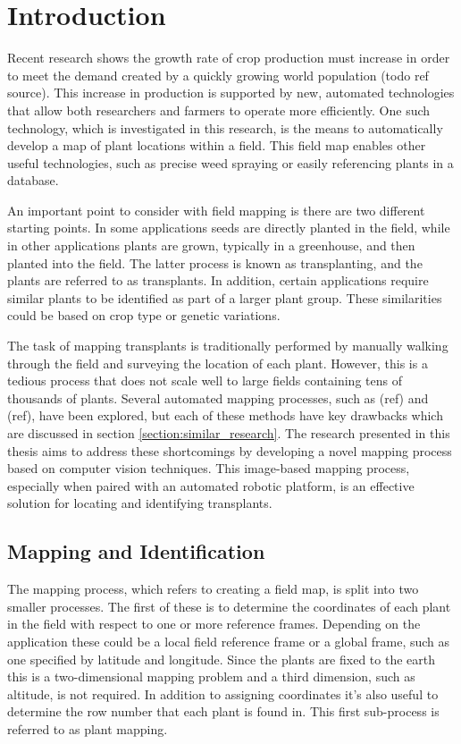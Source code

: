 
\cleardoublepage

\chapter{Introduction}
\label{introduction}

Recent research shows the growth rate of crop production must increase in order to meet the demand created by a quickly growing world population (todo ref source).  This increase in production is supported by new, automated technologies that allow both researchers and farmers to operate more efficiently.  One such technology, which is investigated in this research, is the means to automatically develop a map of plant locations within a field.  This field map enables other useful technologies, such as precise weed spraying or easily referencing plants in a database. 
 
An important point to consider with field mapping is there are two different starting points.  In some applications seeds are directly planted in the field, while in other applications plants are grown, typically in a greenhouse, and then planted into the field.  The latter process is known as transplanting, and the plants are referred to as transplants.  In addition, certain applications require similar plants to be identified as part of a larger plant group.  These similarities could be based on crop type or genetic variations. 

The task of mapping transplants is traditionally performed by manually walking through the field and surveying the location of each plant. However, this is a tedious process that does not scale well to large fields containing tens of thousands of plants.  Several automated mapping processes, such as (ref) and (ref), have been explored, but each of these methods have key drawbacks which are discussed in section \ref{section:similar_research}.  The research presented in this thesis aims to address these shortcomings by developing a novel mapping process based on computer vision techniques.  This image-based mapping process, especially when paired with an automated robotic platform, is an effective solution for locating and identifying transplants. 

\section{Mapping and Identification}

The mapping process, which refers to creating a field map, is split into two smaller processes.  The first of these is to determine the coordinates of each plant in the field with respect to one or more reference frames.  Depending on the application these could be a local field reference frame or a global frame, such as one specified by latitude and longitude.  Since the plants are fixed to the earth this is a two-dimensional mapping problem and a third dimension, such as altitude, is not required.  In addition to assigning coordinates it's also useful to determine the row number that each plant is found in.  This first sub-process is referred to as plant mapping. 

